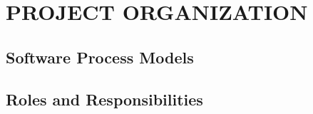 \chapter{PROJECT ORGANIZATION}

\section{Software Process Models}





\section{Roles and Responsibilities}
